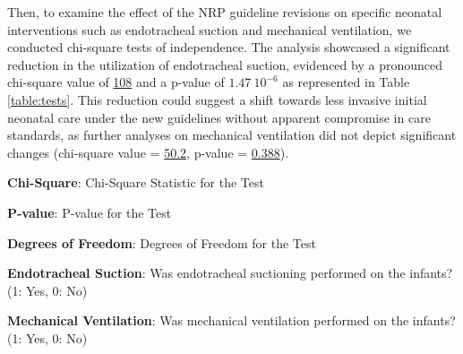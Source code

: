 \documentclass[11pt]{article}
\begin{document}
Then, to examine the effect of the NRP guideline revisions on specific neonatal interventions such as endotracheal suction and mechanical ventilation, we conducted chi-square tests of independence. The analysis showcased a significant reduction in the utilization of endotracheal suction, evidenced by a pronounced chi-square value of \hyperlink{B0a}{108} and a p-value of \hyperlink{B0b}{$1.47\ 10^{-6}$} as represented in Table {}\ref{table:tests}. This reduction could suggest a shift towards less invasive initial neonatal care under the new guidelines without apparent compromise in care standards, as further analyses on mechanical ventilation did not depict significant changes (chi-square value = \hyperlink{B1a}{50.2}, p-value = \hyperlink{B1b}{0.388}).

\begin{table}[h]
\caption{\protect\hyperlink{file-table-1-pkl}{Test of association between policy change and rates of Endotracheal Suction and Mechanical Ventilation, considering confounding factors}}
\label{table:tests}
\begin{threeparttable}
\renewcommand{\TPTminimum}{\linewidth}
\begin{tablenotes}
\footnotesize
\item \textbf{Chi-Square}: Chi-Square Statistic for the Test
\item \textbf{P-value}: P-value for the Test
\item \textbf{Degrees of Freedom}: Degrees of Freedom for the Test
\item \textbf{Endotracheal Suction}: Was endotracheal suctioning performed on the infants? (1: Yes, 0: No)
\item \textbf{Mechanical Ventilation}: Was mechanical ventilation performed on the infants? (1: Yes, 0: No)
\end{tablenotes}
\end{threeparttable}
\end{table}
\end{document}
